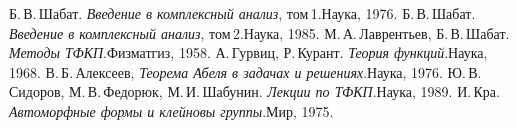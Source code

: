 \documentclass[a4paper]{article}
\begin{document}
\medskip

\begin{thebibliography}{7}
\setlength{\itemsep}{-2pt}
 Б.\,В.\,Шабат. \emph{Введение в комплексный анализ}, том\,1.\т Наука, 1976.
 Б.\,В.\,Шабат. \emph{Введение в комплексный анализ}, том\,2.\т Наука, 1985.
 М.\,А.\,Лаврентьев, Б.\,В.\,Шабат. \emph{Методы ТФКП}.\т Физматгиз, 1958.
 А.\,Гурвиц, Р.\,Курант. \emph{Теория функций}.\т Наука, 1968.
 В.\,Б.\,Алексеев, \emph{Теорема Абеля в задачах и решениях}.\т Наука, 1976.
 Ю.\,В.\,Сидоров, М.\,В.\,Федорюк, М.\,И.\,Шабунин. \emph{Лекции по ТФКП}.\т Наука, 1989.
 И.\,Кра. \emph{Автоморфные формы и клейновы группы}.\т Мир, 1975.
\end{thebibliography}

\medskip\dmvntrail
\end{document}

